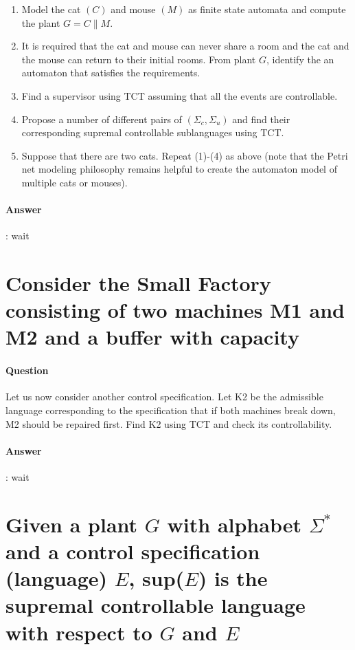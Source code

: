 \documentclass{article}
\begin{document}
\begin{enumerate}
  \item Model the cat $(C)$ and mouse $(M)$ as finite state automata and compute the plant $G=C \| M$.
  \item It is required that the cat and mouse can never share a room and the cat and the mouse can return to their initial rooms. From plant $G$, identify the an automaton that satisfies the requirements.
  \item Find a supervisor using TCT assuming that all the events are controllable.
  \item Propose a number of different pairs of $\left(\Sigma_c, \Sigma_u\right)$ and find their corresponding supremal controllable sublanguages using TCT.
  \item Suppose that there are two cats. Repeat (1)-(4) as above (note that the Petri net modeling philosophy remains helpful to create the automaton model of multiple cats or mouses).
\end{enumerate}

\paragraph{Answer}:
wait


\section{Consider the Small Factory consisting of two machines M1 and M2 and a buffer with capacity}

\paragraph{Question} Let us now consider another control specification. Let K2 be the admissible language corresponding to the specification that if both machines break down, M2 should be repaired first. Find K2 using TCT and check its controllability.

\paragraph{Answer}:
wait

\section{Given a plant $G$ with alphabet $\Sigma^*$ and a control specification (language) $E$, sup($E$) is the supremal controllable language with respect to $G$ and $E$}
\end{document}
